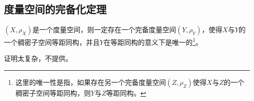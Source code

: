 \subsection{度量空间的完备化定理}
\begin{theorem}
	$(X,\rho_X)$是一个度量空间，则一定存在一个完备度量空间$(Y,\rho_Y)$，使得$X$与$Y$的一个稠密子空间等距同构，并且$Y$在等距同构的意义下是唯一的\footnote{这里的唯一性是指，如果存在另一个完备度量空间$(Z,\rho_Z)$使得$X$与$Z$的一个稠密子空间等距同构，则$Y$与$Z$等距同构。}。
\end{theorem}
证明太复杂，不提供。



